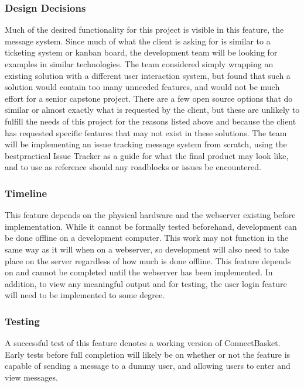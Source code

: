 \documentclass[onecolumn, draftclsnofoot,10pt, compsoc]{IEEEtran}
\begin{document}
\subsubsection{Design Decisions}
Much of the desired functionality for this project is visible in this feature, the message system. Since much of what the client is asking for is similar to a ticketing system or kanban board, the development team will be looking for examples in similar technologies. The team considered simply wrapping an existing solution with a different user interaction system, but found that such a solution would contain too many unneeded features, and would not be much effort for a senior capstone project. There are a few open source options that do similar or almost exactly what is requested by the client, but these are unlikely to fulfill the needs of this project for the reasons listed above and because the client has requested specific features that may not exist in these solutions. The team will be implementing an issue tracking message system from scratch, using the bestpractical Issue Tracker as a guide for what the final product may look like, and to use as reference should any roadblocks or issues be encountered.


\subsubsection{Timeline}
This feature depends on the physical hardware and the webserver existing before implementation. While it cannot be formally tested beforehand, development can be done offline on a development computer. This work may not function in the same way as it will when on a webserver, so development will also need to take place on the server regardless of how much is done offline. This feature depends on and cannot be completed until the webserver has been implemented. In addition, to view any meaningful output and for testing, the user login feature will need to be implemented to some degree.


\subsubsection{Testing}
A successful test of this feature denotes a working version of ConnectBasket. Early tests before full completion will likely be on whether or not the feature is capable of sending a message to a dummy user, and allowing users to enter and view messages.
\end{document}
